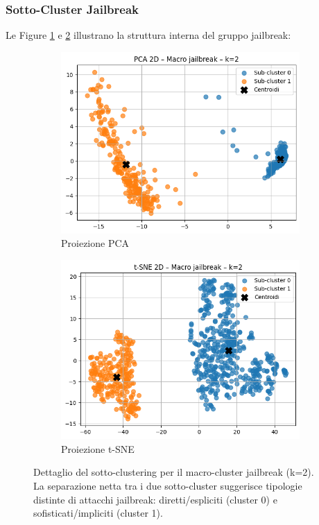 \documentclass[12pt,a4paper]{article}
\begin{document}
\subsubsection{Sotto-Cluster Jailbreak}

Le Figure \ref{fig:jail_pca} e \ref{fig:jail_tsne} illustrano la struttura interna del gruppo jailbreak:

\begin{figure}[H]
    \centering
    \begin{subfigure}[b]{0.48\textwidth}
        \includegraphics[width=\textwidth]{pca1.png}
        \caption{Proiezione PCA}
        \label{fig:jail_pca}
    \end{subfigure}
    \hfill
    \begin{subfigure}[b]{0.48\textwidth}
        \includegraphics[width=\textwidth]{tsne1.png}
        \caption{Proiezione t-SNE}
        \label{fig:jail_tsne}
    \end{subfigure}
    \caption{Dettaglio del sotto-clustering per il macro-cluster jailbreak (k=2). La separazione netta tra i due sotto-cluster suggerisce tipologie distinte di attacchi jailbreak: diretti/espliciti (cluster 0) e sofisticati/impliciti (cluster 1).}
    \label{fig:jailbreak_detail}
\end{figure}
\end{document}
